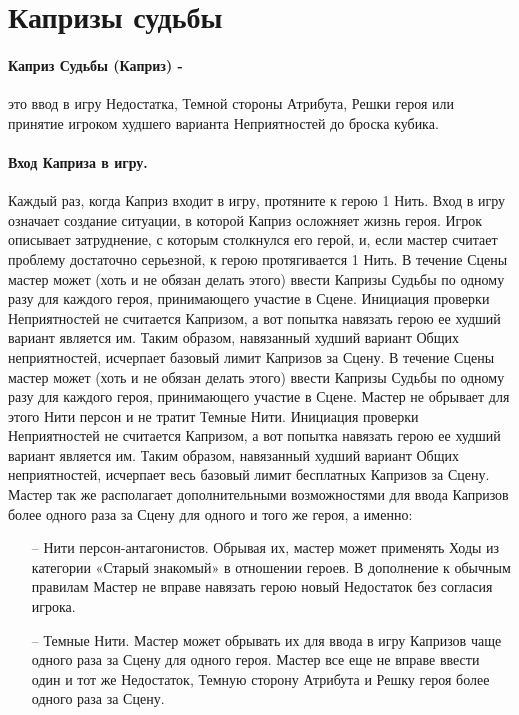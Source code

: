 \section{Капризы судьбы}
\paragraph{Каприз Судьбы (Каприз) -} это ввод в игру Недостатка, Темной стороны Атрибута, Решки героя или принятие игроком худшего варианта Неприятностей до броска кубика.
\paragraph{Вход Каприза в игру.} Каждый раз, когда Каприз входит в игру, протяните к герою 1 Нить. Вход в игру означает создание ситуации, в которой Каприз осложняет жизнь героя. Игрок описывает затруднение, с которым столкнулся его герой, и, если мастер считает проблему достаточно серьезной, к герою протягивается 1 Нить.
\newline В течение Сцены мастер может (хоть и не обязан делать этого) ввести Капризы Судьбы по одному разу для каждого героя, принимающего участие в Сцене.
\newline Инициация проверки Неприятностей не считается Капризом, а вот попытка навязать герою ее худший вариант является им. Таким образом, навязанный худший вариант Общих неприятностей, исчерпает базовый лимит Капризов за Сцену.
\newline В течение Сцены мастер может (хоть и не обязан делать этого) ввести Капризы Судьбы по одному разу для каждого героя, принимающего участие в Сцене. Мастер не обрывает для этого Нити персон и не тратит Темные Нити. 
\newline Инициация проверки Неприятностей не считается Капризом, а вот попытка навязать герою ее худший вариант является им. Таким образом, навязанный худший вариант Общих неприятностей, исчерпает весь базовый лимит бесплатных Капризов за Сцену.
\newline Мастер так же располагает дополнительными возможностями для ввода Капризов более одного раза за Сцену для одного и того же героя, а именно: 
\begin{itemize}
\item[--]Нити персон-антагонистов. Обрывая их, мастер может применять Ходы из категории «Старый знакомый» в отношении героев. В дополнение к обычным правилам Мастер не вправе навязать герою новый Недостаток без согласия игрока.
\item[--]Темные Нити. Мастер может обрывать их для ввода в игру Капризов чаще одного раза за Сцену для одного героя. Мастер все еще не вправе ввести один и тот же Недостаток, Темную сторону Атрибута и Решку героя более одного раза за Сцену.
\end{itemize}
